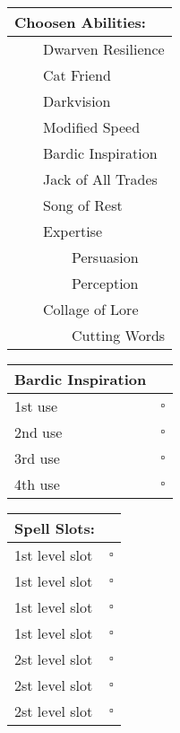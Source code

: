 \documentclass[11pt]{article}
\newcommand{\available}{$\square$}
\newcommand{\tabitem}{~~\llap{--}~~}
\newcommand{\tabtabitem}{~~~~~~\llap{$\bullet$}~~}
\begin{document}
\begin{multicols}{2}
\vspace{2mm}

\noindent \begin{tabularx}{95mm}{@{}l}
{\Large \textbf{Choosen Abilities:}} \\
\hline
\tabitem Dwarven Resilience	\\

\tabitem Cat Friend			\\
\tabitem Darkvision			\\
\tabitem Modified Speed		\\
\tabitem Bardic Inspiration \\
\tabitem Jack of All Trades \\
\tabitem Song of Rest		\\
\tabitem Expertise			\\
\tabtabitem Persuasion		\\
\tabtabitem Perception		\\
\tabitem Collage of Lore	\\
\tabtabitem Cutting Words
		\end{tabularx}

\vspace{2mm}

\noindent \begin{tabularx}{95mm}{@{}l c}
{\Large \textbf{Bardic Inspiration}} \\
\hline
1st use & \available \\
2nd use & \available \\
3rd use & \available \\
4th use & \available
		\end{tabularx}

\vspace{2mm}

\noindent \begin{tabularx}{95mm}{@{}l c}
{\Large \textbf{Spell Slots:}} \\
\hline
1st level slot & \available \\
1st level slot & \available \\
1st level slot & \available \\
1st level slot & \available \\
2st level slot & \available \\
2st level slot & \available \\
2st level slot & \available
		\end{tabularx}
	\end{multicols}
\end{document}
